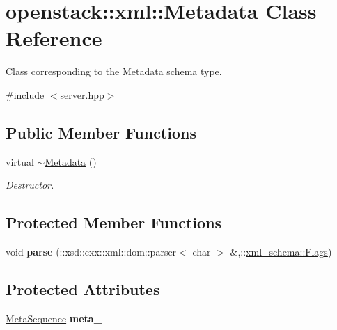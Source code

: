 \hypertarget{classopenstack_1_1xml_1_1Metadata}{
\section{openstack::xml::Metadata Class Reference}
\label{classopenstack_1_1xml_1_1Metadata}
}


Class corresponding to the Metadata schema type.  




{\ttfamily \#include $<$server.hpp$>$}

\subsection*{Public Member Functions}
\begin{DoxyCompactItemize}
\item 
\hypertarget{classopenstack_1_1xml_1_1Metadata_a8af08c4a59c2b8b36a2a20a7a1e3fbe6}{
virtual \hyperlink{classopenstack_1_1xml_1_1Metadata_a8af08c4a59c2b8b36a2a20a7a1e3fbe6}{$\sim$Metadata} ()}
\label{classopenstack_1_1xml_1_1Metadata_a8af08c4a59c2b8b36a2a20a7a1e3fbe6}

\begin{DoxyCompactList}\small\item\em Destructor. \item\end{DoxyCompactList}\end{DoxyCompactItemize}
\subsection*{Protected Member Functions}
\begin{DoxyCompactItemize}
\item 
\hypertarget{classopenstack_1_1xml_1_1Metadata_ab169359a51d1ec9def94dfaf8fe22d58}{
void {\bfseries parse} (::xsd::cxx::xml::dom::parser$<$ char $>$ \&,::\hyperlink{namespacexml__schema_affb4c227cbd9aa7453dd1dc5a1401943}{xml\_\-schema::Flags})}
\label{classopenstack_1_1xml_1_1Metadata_ab169359a51d1ec9def94dfaf8fe22d58}

\end{DoxyCompactItemize}
\subsection*{Protected Attributes}
\begin{DoxyCompactItemize}
\item 
\hypertarget{classopenstack_1_1xml_1_1Metadata_a121b0586e544263a30eefcb5d04e3246}{
\hyperlink{classopenstack_1_1xml_1_1Metadata_a625af6c431b37f4669b9526fea99ecfd}{MetaSequence} {\bfseries meta\_\-}}
\label{classopenstack_1_1xml_1_1Metadata_a121b0586e544263a30eefcb5d04e3246}

\end{DoxyCompactItemize}
